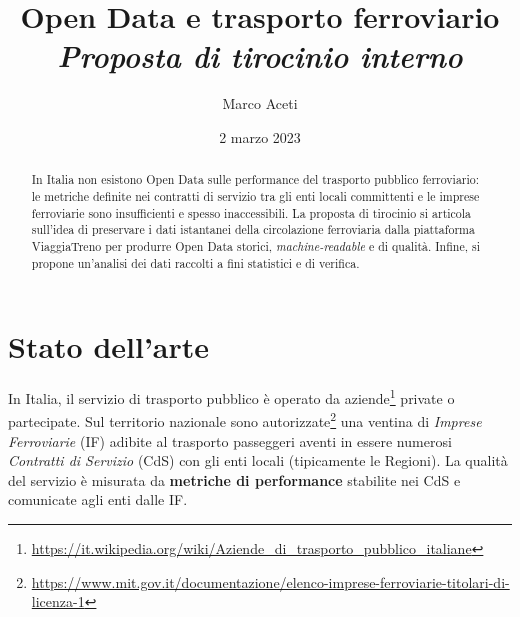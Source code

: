 \documentclass[italian,11pt,a4paper,final]{article}
\date{2 marzo 2023}
\author{Marco Aceti}
\title{
	Open Data e trasporto ferroviario \\
	\textit{\small{Proposta di tirocinio interno}}
}
\begin{document}
	\maketitle
	
	\begin{abstract}
		In Italia non esistono Open Data sulle performance del trasporto pubblico ferroviario: le metriche definite nei contratti di servizio tra gli enti locali committenti e le imprese ferroviarie sono insufficienti e spesso inaccessibili.
		La proposta di tirocinio si articola sull'idea di preservare i dati istantanei della circolazione ferroviaria dalla piattaforma ViaggiaTreno per produrre Open Data storici, \textit{machine-readable} e di qualità.
		Infine, si propone un'analisi dei dati raccolti a fini statistici e di verifica.
	\end{abstract}

	\section{Stato dell'arte}
	In Italia, il servizio di trasporto pubblico è operato da aziende\footnote{\url{https://it.wikipedia.org/wiki/Aziende_di_trasporto_pubblico_italiane}} private o partecipate. 
	Sul territorio nazionale sono autorizzate\footnote{\url{https://www.mit.gov.it/documentazione/elenco-imprese-ferroviarie-titolari-di-licenza-1}} una ventina di \textit{Imprese Ferroviarie} (IF) adibite al trasporto passeggeri aventi in essere numerosi \textit{Contratti di Servizio} (CdS) con gli enti locali (tipicamente le Regioni).
	La qualità del servizio è misurata da \textbf{metriche di performance} stabilite nei CdS e comunicate agli enti dalle IF.
	
\end{document}
